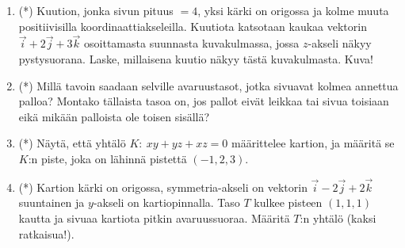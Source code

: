 \begin{enumerate}
\item (*)
Kuution, jonka sivun pituus $=4$, yksi kärki on origossa ja kolme muuta positiivisilla
koordinaattiakseleilla. Kuutiota katsotaan kaukaa vektorin $\vec i+2\vec j+3\vec k$
osoittamasta suunnasta kuvakulmassa, jossa $z$-akseli näkyy pystysuorana. Laske, millaisena
kuutio näkyy tästä kuvakulmasta. Kuva!

\item (*)
Millä tavoin saadaan selville avaruustasot, jotka sivuavat kolmea annettua palloa? Montako
tällaista tasoa on, jos pallot eivät leikkaa tai sivua toisiaan eikä mikään palloista ole 
toisen sisällä?

\item (*)
Näytä, että yhtälö $K:\ xy+yz+xz=0$ määrittelee kartion, ja määritä se $K$:n piste, joka on
lähinnä pistettä $(-1,2,3)$.

\item (*)
Kartion kärki on origossa, symmetria-akseli on vektorin $\vec i-2\vec j+2\vec k$ suuntainen
ja $y$-akseli on kartiopinnalla. Taso $T$ kulkee pisteen $(1,1,1)$ kautta ja sivuaa kartiota
pitkin avaruussuoraa. Määritä $T$:n yhtälö (kaksi ratkaisua!).

\end{enumerate}